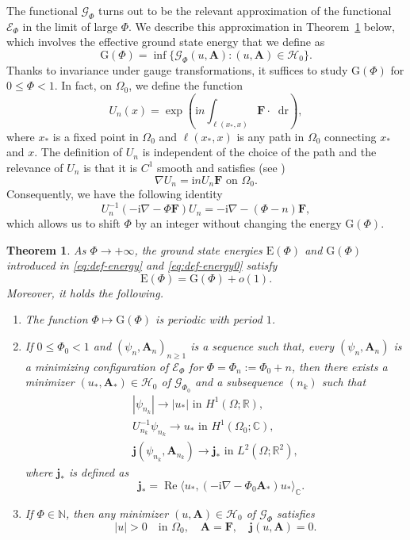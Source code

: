 \documentclass[11pt]{amsart}
\DeclareMathOperator{\re}{Re}
\newcommand{\R}{\mathbb R}
\newcommand{\C}{\mathbb C}
\newcommand{\N}{\mathbb N}
\newcommand{\Ab}{\mathbf A}
\newcommand{\Fb}{\mathbf F}
\newcommand{\dd}{\mathop{}\!{\mathrm d}}
\newcommand{\ii}{\mathrm i}
\newcommand{\Ef}{\mathcal E_\Phi}
\newcommand{\En}{\mathrm E(\Phi)}
\newcommand{\Gf}{\mathcal G_\Phi}
\newcommand{\Gn}{\mathrm G(\Phi)}
\newcommand{\cG}{\mathcal G}
\newcommand{\jb}{\mathbf j}
\newcommand{\cH}{\mathcal H}
\newtheorem{theorem}{Theorem}[section]
\theoremstyle{definition}
\numberwithin{equation}{section}
\begin{document}
The functional $\Gf$ turns out to be the relevant approximation of the functional $\Ef$ in the limit of large $\Phi$. We describe this approximation in Theorem~\ref{thm:GL} below, which  involves the  effective ground state energy that we define as
\begin{equation}\label{eq:def-energy0}
\Gn=\inf\{\Gf(u,\Ab)\colon (u,\Ab)\in \cH_0\}.
\end{equation}
Thanks to invariance under gauge transformations, it suffices to study $\Gn$  for $0\leq \Phi<1$. In fact, on $\Omega_0$, we define the  function
\begin{equation}\label{eq:def-U-1}
U_n(x)=\exp\left(\ii n\int_{\ell(x_*,x)}\Fb\cdot\dd \mathrm r\right),
\end{equation}
where $x_*$ is a fixed point in $\Omega_0$ and $\ell(x_*,x)$ is any path in $\Omega_0$ connecting $x_*$ and $x$. The definition of $U_n$ is independent of the choice of the path and the relevance of $U_n$ is that  it is $C^1$ smooth and satisfies (see \cite[p. 21]{FH-b})
\begin{equation}\label{eq:prop-U1}
\nabla U_n=\ii  n U_n \Fb \text{ on }\Omega_0.
\end{equation}
Consequently, we have the following identity
\begin{equation}\label{eq:prop-U1*}
U_n^{-1}(-\ii\nabla-\Phi\Fb)U_n=-\ii\nabla-(\Phi-n)\Fb,
\end{equation}
which allows us to shift $\Phi$  by an integer  without changing the energy $\Gn$.
%
\begin{theorem}\label{thm:GL}
As $\Phi\to+\infty$, the ground state energies $\En$ and $\Gn$ introduced in \eqref{eq:def-energy} and \eqref{eq:def-energy0} satisfy
\[\En= \Gn+o(1).\]
Moreover, it holds the following.
\begin{enumerate}[\rm i)]
\item The function $\Phi\mapsto \Gn$ is periodic with period $1$.
\item If $0\leq \Phi_0<1$ and $(\psi_n,\Ab_n)_{n\geq 1}$ is a sequence such that, every $(\psi_n,\Ab_n)$ is a minimizing configuration of $\Ef$ for $\Phi=\Phi_n:=\Phi_0+n$, then there exists a minimizer $(u_*,\Ab_*)\in \cH_0$ of $\cG_{\Phi_0}$ and a subsequence $(n_k)$ such that
%
\[\begin{gathered}
|\psi_{n_k}|\to |u_*|\text{ in }H^1(\Omega; \R),\\
U_{n_k}^{-1}\psi_{n_k}\to u_*\text{ in }H^1(\Omega_0;\C),\\ \jb(\psi_{n_k},\Ab_{n_k})\to\jb_*\text{ in }L^2(\Omega;\R^2),
\end{gathered}\]
where  $\jb_*$ is defined as
\[\quad \jb_*= {\re} \langle u_*,(-\ii\nabla-{\Phi_0}\Ab_*)u_*\rangle_\C.
\]
\item If $\Phi\in \N$, then any minimizer $(u,\Ab)\in\cH_0$ of $\Gf$ satisfies
\[ |u|>0 \text {\ { in \(\Omega _ 0\)}},\quad \Ab=\Fb,\quad \jb(u,\Ab)=0.\]
\end{enumerate}
\end{theorem}
\end{document}

